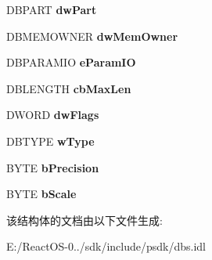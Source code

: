 \begin{DoxyCompactItemize}
D\+B\+P\+A\+RT {\bfseries dw\+Part}
\item 
\mbox{\label{structtag_d_b_b_i_n_d_i_n_g_a4d8258709288dc2b6b50d5a616923c50}} 
D\+B\+M\+E\+M\+O\+W\+N\+ER {\bfseries dw\+Mem\+Owner}
\item 
\mbox{\label{structtag_d_b_b_i_n_d_i_n_g_a22157a960450ded72f89c46544ea7291}} 
D\+B\+P\+A\+R\+A\+M\+IO {\bfseries e\+Param\+IO}
\item 
\mbox{\label{structtag_d_b_b_i_n_d_i_n_g_ac2abc612a6167060af06abea22b07bcf}} 
D\+B\+L\+E\+N\+G\+TH {\bfseries cb\+Max\+Len}
\item 
\mbox{\label{structtag_d_b_b_i_n_d_i_n_g_a274aa3696e4f60b87133c200926fdfee}} 
D\+W\+O\+RD {\bfseries dw\+Flags}
\item 
\mbox{\label{structtag_d_b_b_i_n_d_i_n_g_a34adf0cdea1b106f397c2b3271814d80}} 
D\+B\+T\+Y\+PE {\bfseries w\+Type}
\item 
\mbox{\label{structtag_d_b_b_i_n_d_i_n_g_af6481500ebf318e3f2007bc002097267}} 
B\+Y\+TE {\bfseries b\+Precision}
\item 
\mbox{\label{structtag_d_b_b_i_n_d_i_n_g_a4da34d65fef87b0e9412642207529c0b}} 
B\+Y\+TE {\bfseries b\+Scale}
\end{DoxyCompactItemize}


该结构体的文档由以下文件生成\+:\begin{DoxyCompactItemize}
\item 
E\+:/\+React\+O\+S-\/0../sdk/include/psdk/dbs.\+idl\end{DoxyCompactItemize}
